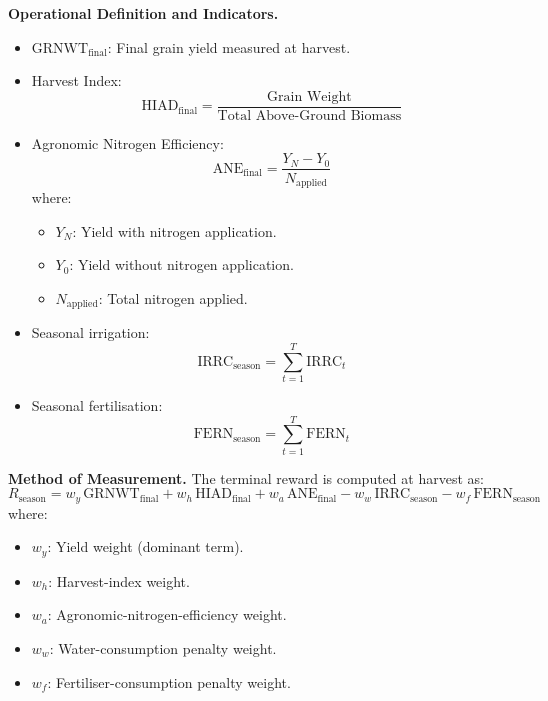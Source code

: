 \vspace{0.2cm}
\noindent\textbf{Operational Definition and Indicators.}
\begin{itemize}
  \item $\mathrm{GRNWT}_{\text{final}}$: Final grain yield measured at harvest.
  \item Harvest Index:
  \begin{equation}
  \mathrm{HIAD}_{\text{final}}= \frac{\text{Grain Weight}}{\text{Total Above-Ground Biomass}}
  \end{equation}
  \item Agronomic Nitrogen Efficiency:
  \begin{equation}
  \mathrm{ANE}_{\text{final}}= \frac{Y_N-Y_0}{N_{\text{applied}}}
  \end{equation}
  where:
  \begin{itemize}
      \item $Y_N$: Yield with nitrogen application.
      \item $Y_0$: Yield without nitrogen application.
      \item $N_{\text{applied}}$: Total nitrogen applied.
  \end{itemize}
  \item Seasonal irrigation:
  \begin{equation}
  \mathrm{IRRC}_{\text{season}}= \sum_{t=1}^{T} \mathrm{IRRC}_t
  \end{equation}
  \item Seasonal fertilisation:
  \begin{equation}
  \mathrm{FERN}_{\text{season}}= \sum_{t=1}^{T} \mathrm{FERN}_t
  \end{equation}
\end{itemize}

\vspace{0.2cm}
\noindent\textbf{Method of Measurement.}
The terminal reward is computed at harvest as:
\begin{equation}
R_{\text{season}}= w_y\,\mathrm{GRNWT}_{\text{final}} + w_h\,\mathrm{HIAD}_{\text{final}} + w_a\,\mathrm{ANE}_{\text{final}}
            - w_w\,\mathrm{IRRC}_{\text{season}} - w_f\,\mathrm{FERN}_{\text{season}}
\label{eq:season_reward}
\end{equation}
where:
\begin{itemize}
    \item $w_y$: Yield weight (dominant term).
    \item $w_h$: Harvest-index weight.
    \item $w_a$: Agronomic-nitrogen-efficiency weight.
    \item $w_w$: Water-consumption penalty weight.
    \item $w_f$: Fertiliser-consumption penalty weight.
\end{itemize}

